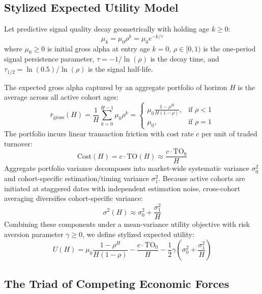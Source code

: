 \documentclass[11pt,a4paper]{article}
\theoremstyle{definition}
\begin{document}
\subsection{Stylized Expected Utility Model}

Let predictive signal quality decay geometrically with holding age $k \ge 0$:
\begin{equation}
\mu_k = \mu_0 \rho^k = \mu_0 e^{-k / \tau}
\end{equation}
where $\mu_0 \ge 0$ is initial gross alpha at entry age $k=0$, $\rho \in [0, 1)$ is the one-period signal persistence parameter, $\tau = -1/\ln(\rho)$ is the decay time, and $\tau_{1/2} = \ln(0.5)/\ln(\rho)$ is the signal half-life.

The expected gross alpha captured by an aggregate portfolio of horizon $H$ is the average across all active cohort ages:
\begin{equation}
\bar{r}_{\text{gross}}(H) = \frac{1}{H} \sum_{k=0}^{H-1} \mu_0 \rho^k = 
\begin{cases} 
\mu_0 \frac{1 - \rho^H}{H(1 - \rho)}, & \text{if } \rho < 1 \\ 
\mu_0, & \text{if } \rho = 1 
\end{cases}
\end{equation}
The portfolio incurs linear transaction friction with cost rate $c$ per unit of traded turnover:
\begin{equation}
\text{Cost}(H) = c \cdot \text{TO}(H) \approx \frac{c \cdot \text{TO}_0}{H}
\end{equation}
Aggregate portfolio variance decomposes into market-wide systematic variance $\sigma_0^2$ and cohort-specific estimation/timing variance $\sigma_1^2$. Because active cohorts are initiated at staggered dates with independent estimation noise, cross-cohort averaging diversifies cohort-specific variance:
\begin{equation}
\sigma^2(H) \approx \sigma_0^2 + \frac{\sigma_1^2}{H}
\end{equation}
Combining these components under a mean-variance utility objective with risk aversion parameter $\gamma \ge 0$, we define stylized expected utility:
\begin{equation}
U(H) = \mu_0 \frac{1 - \rho^H}{H(1 - \rho)} - \frac{c \cdot \text{TO}_0}{H} - \frac{1}{2}\gamma \left(\sigma_0^2 + \frac{\sigma_1^2}{H}\right)
\label{eq:utility}
\end{equation}

\subsection{The Triad of Competing Economic Forces}
\end{document}
